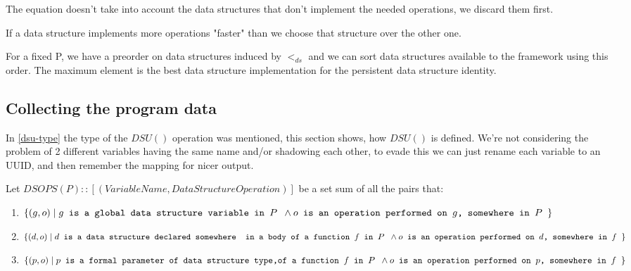 \documentclass[a4paper,11pt]{article}
\begin{document}
		The equation doesn't take into account the data structures that don't implement the needed operations,
		we discard them first.

		If a data structure implements more operations "faster" than we choose that structure over
		the other one.

		For a fixed P, we have a preorder on data structures induced by $<_{ds}$ and we can sort data structures
		available to the framework using this order. The maximum element is the best data structure
		implementation for the persistent data structure identity.

	\subsection{Collecting the program data} \label{dsu-definition}

		In \autoref{dsu-type} the type of the $DSU()$ operation was mentioned, this section shows, how $DSU()$ is
		defined. We're not considering the problem of 2 different variables having the same name and/or shadowing each
        other, to evade this we can just rename each variable to an UUID, and then remember the mapping for nicer
        output.

		Let $DSOPS(P) :: [(VariableName, DataStructureOperation)]$ be a set sum of all the pairs that:
		\begin{enumerate}

			\item \label{it:global} $\{(g, o)\; |\; g \texttt{ is a global data structure variable in $P$ }
				\wedge \\ o \texttt{ is an operation performed on $g$, somewhere in $P$ } \}$

			\item \label{it:auto} $\{(d, o)\; |\; d \texttt{ is a data structure declared somewhere } \\
				\texttt{ in a body of a function $f$ in $P$ } \wedge \\ o \texttt{ is an operation
				performed on $d$, somewhere in $f$ } \}$

			\item \label{it:param} $\{(p, o)\; |\; p \texttt{ is a formal parameter of data structure type,}
				\\ \texttt{of a function $f$ in $P$ } \wedge \\ o \texttt{ is an operation performed on
				$p$, somewhere in $f$ } \}$

		\end{enumerate}
\end{document}
